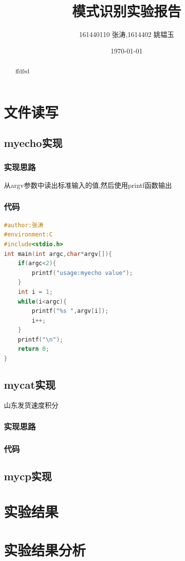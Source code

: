\documentclass{article}
\title{\textbf{\zihao{2}模式识别实验报告\\ }}
\author{161440110 张涛,1614402 姚韫玉}
\date{\today}
\begin{document}

\maketitle
\begin{abstract}
ffdfsd
\end{abstract}
\section{文件读写}
	\subsection{myecho实现}
	\subsubsection{实现思路}
	从argv参数中读出标准输入的值,然后使用printf函数输出
	\subsubsection{代码}
	\begin{lstlisting}[language=C]
#author:张涛
#environment:C
#include<stdio.h>
int main(int argc,char*argv[]){
    if(argc<2){
        printf("usage:myecho value");
    }
    int i = 1;
    while(i<argc){
        printf("%s ",argv[i]);
        i++;
    }
    printf("\n");
    return 0;
}
\end{lstlisting}
	\subsection{mycat实现}
	山东发货速度积分
	\subsubsection{实现思路}
	
	\subsubsection{代码}	
	\subsection{mycp实现}
\section{实验结果\cite{buettner2006x}}
\section{实验结果分析\cite{dunkels2011contikimac}}


\end{document}
